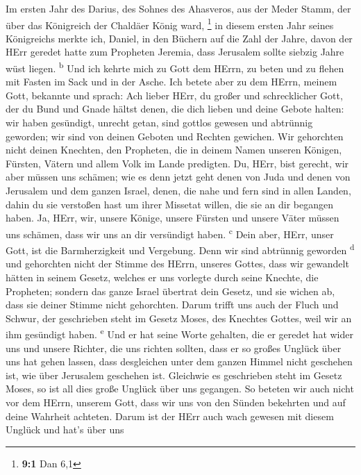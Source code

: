  Im ersten Jahr des Darius, des Sohnes des Ahasveros, aus
der Meder Stamm, der über das Königreich der Chaldäer König ward,
\footnote{\textbf{9:1} Dan 6,1}  in diesem ersten Jahr
seines Königreichs merkte ich, Daniel, in den Büchern auf die Zahl der
Jahre, davon der HErr geredet hatte zum Propheten Jeremia, dass
Jerusalem sollte siebzig Jahre wüst liegen. \textsuperscript{b}
 Und ich kehrte mich zu Gott dem HErrn, zu beten und zu
flehen mit Fasten im Sack und in der Asche.  Ich betete
aber zu dem HErrn, meinem Gott, bekannte und sprach: Ach lieber HErr, du
großer und schrecklicher Gott, der du Bund und Gnade hältst denen, die
dich lieben und deine Gebote halten:  wir haben gesündigt,
unrecht getan, sind gottlos gewesen und abtrünnig geworden; wir sind von
deinen Geboten und Rechten gewichen.  Wir gehorchten nicht
deinen Knechten, den Propheten, die in deinem Namen unseren Königen,
Fürsten, Vätern und allem Volk im Lande predigten.  Du,
HErr, bist gerecht, wir aber müssen uns schämen; wie es denn jetzt geht
denen von Juda und denen von Jerusalem und dem ganzen Israel, denen, die
nahe und fern sind in allen Landen, dahin du sie verstoßen hast um ihrer
Missetat willen, die sie an dir begangen haben.  Ja, HErr,
wir, unsere Könige, unsere Fürsten und unsere Väter müssen uns schämen,
dass wir uns an dir versündigt haben. \textsuperscript{c} 
Dein aber, HErr, unser Gott, ist die Barmherzigkeit und Vergebung. Denn
wir sind abtrünnig geworden \textsuperscript{d}  und
gehorchten nicht der Stimme des HErrn, unseres Gottes, dass wir
gewandelt hätten in seinem Gesetz, welches er uns vorlegte durch seine
Knechte, die Propheten;  sondern das ganze Israel
übertrat dein Gesetz, und sie wichen ab, dass sie deiner Stimme nicht
gehorchten. Darum trifft uns auch der Fluch und Schwur, der geschrieben
steht im Gesetz Moses, des Knechtes Gottes, weil wir an ihm gesündigt
haben. \textsuperscript{e}  Und er hat seine Worte
gehalten, die er geredet hat wider uns und unsere Richter, die uns
richten sollten, dass er so großes Unglück über uns hat gehen lassen,
dass desgleichen unter dem ganzen Himmel nicht geschehen ist, wie über
Jerusalem geschehen ist.  Gleichwie es geschrieben steht
im Gesetz Moses, so ist all dies große Unglück über uns gegangen. So
beteten wir auch nicht vor dem HErrn, unserem Gott, dass wir uns von den
Sünden bekehrten und auf deine Wahrheit achteten.  Darum
ist der HErr auch wach gewesen mit diesem Unglück und hat's über uns
